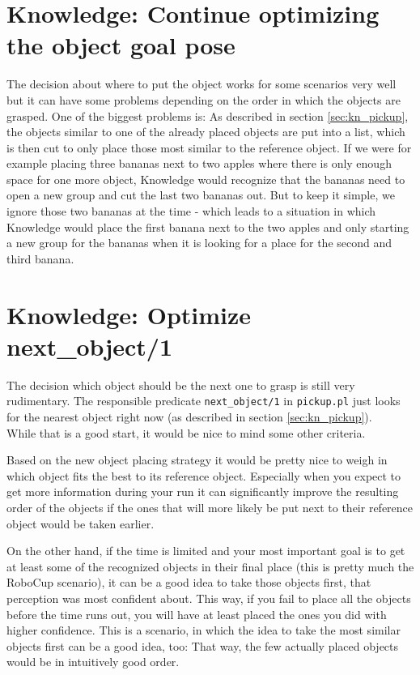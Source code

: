 \documentclass[main.tex]{subfiles}
\begin{document}
		\section{Knowledge: Continue optimizing the object goal pose}
		The decision about where to put the object works for some scenarios very well but it can have some problems depending on the order in which the objects are grasped. One of the biggest problems is: As described in section \ref{sec:kn_pickup}, the objects similar to one of the already placed objects are put into a list, which is then cut to only place those most similar to the reference object. If we were for example placing three bananas next to two apples where there is only enough space for one more object, Knowledge would recognize that the bananas need to open a new group and cut the last two bananas out. But to keep it simple, we ignore those two bananas at the time - which leads to a situation in which Knowledge would place the first banana next to the two apples and only starting a new group for the bananas when it is looking for a place for the second and third banana.
	  	
	  	\section{Knowledge: Optimize next\_object/1}\label{sec:nextObj}
	  	The decision which object should be the next one to grasp is still very rudimentary. The responsible predicate \texttt{next\_object/1} in \texttt{pickup.pl} just looks for the nearest object right now (as described in section \ref{sec:kn_pickup}).\\
	  	While that is a good start, it would be nice to mind some other criteria.
	  	
	  	Based on the new object placing strategy it would be pretty nice to weigh in which object fits the best to its reference object. Especially when you expect to get more information during your run it can significantly improve the resulting order of the objects if the ones that will more likely be put next to their reference object would be taken earlier.
	  	
		On the other hand, if the time is limited and your most important goal is to get at least some of the recognized objects in their final place (this is pretty much the RoboCup scenario), it can be a good idea to take those objects first, that perception was most confident about. This way, if you fail to place all the objects before the time runs out, you will have at least placed the ones you did with higher confidence. This is a scenario, in which the idea to take the most similar objects first can be a good idea, too: That way, the few actually placed objects would be in intuitively good order.
		
\end{document}

